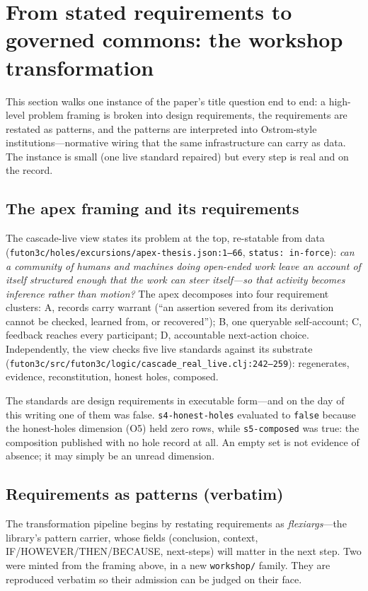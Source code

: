 \section{From stated requirements to governed commons: the workshop
transformation}\label{sec:institutions}

This section walks one instance of the paper's title question end to
end: a high-level problem framing is broken into design requirements, the
requirements are restated as patterns, and the patterns are interpreted
into Ostrom-style institutions---normative wiring that the same
infrastructure can carry as data. The instance is small (one live
standard repaired) but every step is real and on the record.

\subsection{The apex framing and its requirements}

The cascade-live view states its problem at the top, re-statable from
data
(\texttt{futon3c/holes/excursions/apex-thesis.json:1--66},
\texttt{status: in-force}): \emph{can a community of humans and machines
doing open-ended work leave an account of itself structured enough that
the work can steer itself---so that activity becomes inference rather
than motion?} The apex decomposes into four requirement clusters:
A, records carry warrant (``an assertion severed from its derivation
cannot be checked, learned from, or recovered''); B, one queryable
self-account; C, feedback reaches every participant; D, accountable
next-action choice. Independently, the view checks five live standards
against its substrate
(\texttt{futon3c/src/futon3c/logic/cascade\_real\_live.clj:242--259}):
regenerates, evidence, reconstitution, honest holes, composed.

The standards are design requirements in executable form---and on the
day of this writing one of them was false. \texttt{s4-honest-holes}
evaluated to \texttt{false} because the honest-holes dimension (O5)
held zero rows, while \texttt{s5-composed} was true: the composition
published with no hole record at all. An empty set is not evidence of
absence; it may simply be an unread dimension.

\subsection{Requirements as patterns (verbatim)}

The transformation pipeline begins by restating requirements as
\emph{flexiargs}---the library's pattern carrier, whose fields
(conclusion, context, IF/HOWEVER/THEN/BECAUSE, next-steps) will matter
in the next step. Two were minted from the framing above, in a new
\texttt{workshop/} family. They are reproduced verbatim so their
admission can be judged on their face.

